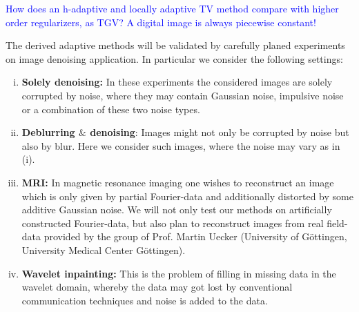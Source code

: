 \documentclass[enabledeprecatedfontcommands,cleardoublepage=empty,headsepline,twoside,11pt,DIV=15,BCOR=12mm,final]{scrartcl}
\begin{document}
 \textcolor{blue}{How does an h-adaptive and locally adaptive TV method compare with higher order regularizers, as TGV? A digital image is always piecewise constant!}
 
The derived adaptive methods will be validated by carefully planed experiments on image denoising application. In particular we consider the following settings:

\begin{enumerate}[(i)]
\item \textbf{Solely denoising:} In these experiments the considered images are solely corrupted by noise, where they may contain Gaussian noise, impulsive noise or a combination of these two noise types.

\item \textbf{Deblurring $\&$ denoising}: Images might not only be corrupted by noise but also by blur. Here we consider such images, where the noise may vary as in (i).

\item \textbf{MRI:} In magnetic resonance imaging one wishes to reconstruct an image which is only given by partial Fourier-data and additionally distorted by some additive Gaussian noise. We will not only test our methods on artificially constructed Fourier-data, but also plan to reconstruct images from real field-data provided by the group of Prof. Martin Uecker (University of G\"ottingen, University Medical Center G\"ottingen).

\item \textbf{Wavelet inpainting:} This is the problem of filling in missing data in the wavelet domain, whereby the data may got lost by conventional communication techniques and noise is added to the data. 

\end{enumerate}
\end{document}
